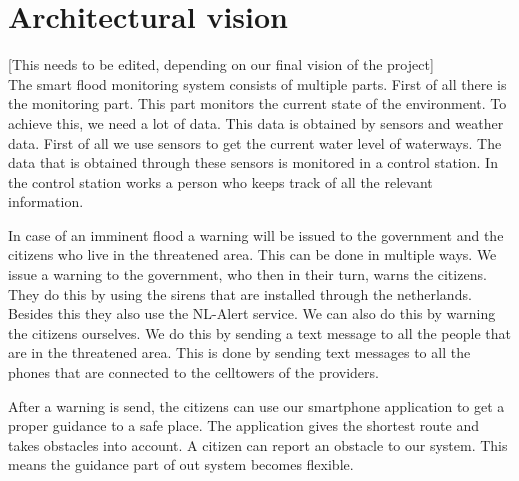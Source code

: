 \section{Architectural vision}
[This needs to be edited, depending on our final vision of the project]\\
The smart flood monitoring system consists of multiple parts. First of all there is the monitoring part. This part monitors the current state of the environment. To achieve this, we need a lot of data. This data is obtained by sensors and weather data. First of all we use sensors to get the current water level of waterways. The data that is obtained through these sensors is monitored in a control station. In the control station works a person who keeps track of all the relevant information. 

In case of an imminent flood a warning will be issued to the government and the citizens who live in the threatened area. This can be done in multiple ways. We issue a warning to the government, who then in their turn, warns the citizens. They do this by using the sirens that are installed through the netherlands. Besides this they also use the NL-Alert service. We can also do this by warning the citizens ourselves. We do this by sending a text message to all the people that are in the threatened area. This is done by sending text messages to all the phones that are connected to the celltowers of the providers. 

After a warning is send, the citizens can use our smartphone application to get a proper guidance to a safe place. The application gives the shortest route and takes obstacles into account. A citizen can report an obstacle to our system. This means the guidance part of out system becomes flexible. 